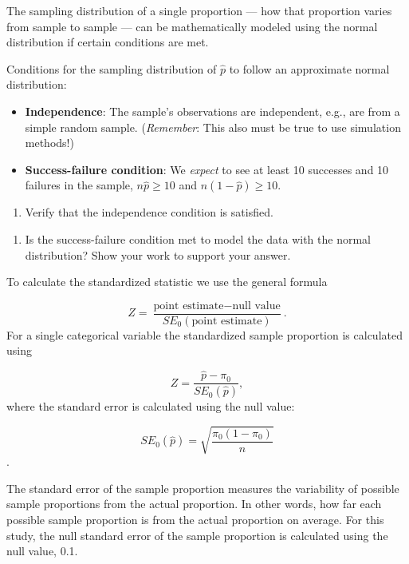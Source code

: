 \documentclass[
]{report}
\providecommand{\tightlist}{%
  \setlength{\itemsep}{0pt}\setlength{\parskip}{0pt}}
\begin{document}
The sampling distribution of a single proportion --- how that proportion varies from sample to sample --- can be mathematically modeled using the normal distribution if certain conditions are met.

Conditions for the sampling distribution of \(\hat{p}\) to follow an approximate normal distribution:

\begin{itemize}
\item
  \textbf{Independence}: The sample's observations are independent, e.g., are from a simple random sample. (\emph{Remember}: This also must be true to use simulation methods!)
\item
  \textbf{Success-failure condition}: We \emph{expect} to see at least 10 successes and 10 failures in the sample, \(n\hat{p}≥10\) and \(n(1-\hat{p})≥10\).
\end{itemize}

\begin{enumerate}
\def\labelenumi{\arabic{enumi}.}
\setcounter{enumi}{4}
\tightlist
\item
  Verify that the independence condition is satisfied.
\end{enumerate}

\vspace{0.5in}

\begin{enumerate}
\def\labelenumi{\arabic{enumi}.}
\setcounter{enumi}{5}
\tightlist
\item
  Is the success-failure condition met to model the data with the normal distribution? Show your work to support your answer.
\end{enumerate}

\vspace{1in}
\newpage

To calculate the standardized statistic we use the general formula

\[
Z = \frac{\text{point estimate} - \text{null value}}{SE_0(\text{point estimate})}.
\]
For a single categorical variable the standardized sample proportion is calculated using

\[
Z = \frac{\hat{p} - \pi_0}{SE_0(\hat{p})},
\]
where the standard error is calculated using the null value:

\[SE_0(\hat{p})=\sqrt{\frac{\pi_0(1-\pi_0)}{n}}\].

The standard error of the sample proportion measures the variability of possible sample proportions from the actual proportion. In other words, how far each possible sample proportion is from the actual proportion on average. For this study, the null standard error of the sample proportion is calculated using the null value, 0.1.
\end{document}

